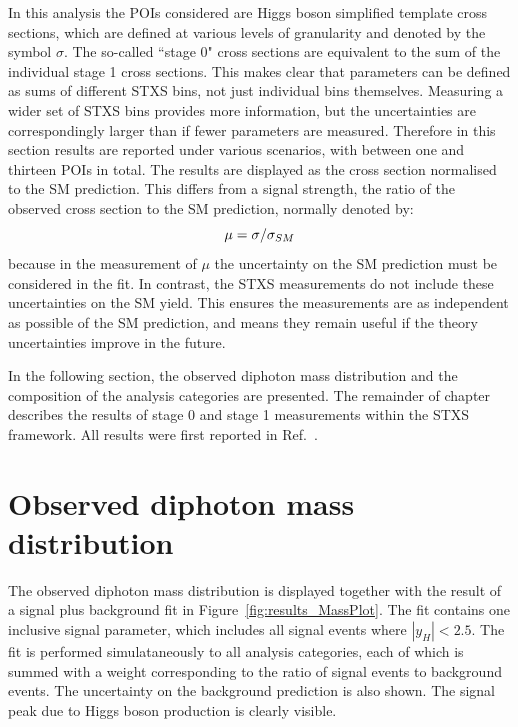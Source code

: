 In this analysis the POIs considered are Higgs boson simplified template cross sections, 
which are defined at various levels of granularity and denoted by the symbol $\sigma$.
The so-called ``stage 0" cross sections are equivalent 
to the sum of the individual stage 1 cross sections.
This makes clear that parameters can be defined as sums of different STXS bins, 
not just individual bins themselves.
Measuring a wider set of STXS bins provides more information, 
but the uncertainties are correspondingly larger than if fewer parameters are measured.
Therefore in this section results are reported under various scenarios, 
with between one and thirteen POIs in total.
The results are displayed as the cross section normalised to the SM prediction. 
This differs from a signal strength, the ratio of the observed cross section 
to the SM prediction, normally denoted by:
\begin{equation}
\mu = \sigma / \sigma_{SM}
\end{equation}
because in the measurement of $\mu$ 
the uncertainty on the SM prediction must be considered in the fit. 
In contrast, the STXS measurements do not include these uncertainties on the SM yield.
This ensures the measurements are as independent as possible of the SM prediction, 
and means they remain useful if the theory uncertainties improve in the future.

In the following section, the observed diphoton mass distribution
and the composition of the analysis categories are presented.
The remainder of chapter describes the results of stage 0 and stage 1 measurements 
within the STXS framework.
All results were first reported in Ref.~\cite{HIG-18-029}.

\section{Observed diphoton mass distribution}

The observed diphoton mass distribution is displayed together with the result 
of a signal plus background fit in Figure~\ref{fig:results_MassPlot}.
The fit contains one inclusive signal parameter, 
which includes all signal events where $|y_H| < 2.5$.
The fit is performed simulataneously to all analysis categories, 
each of which is summed with a weight 
corresponding to the ratio of signal events to background events. %
The uncertainty on the background prediction is also shown.
The signal peak due to Higgs boson production is clearly visible.


